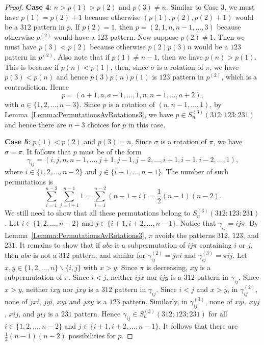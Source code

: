 \documentclass[10pt,a4paper]{amsart}
\newcommand{\half}{{\textstyle\frac12}}
\numberwithin{equation}{section}
\begin{document}
\begin{proof}
    {\bf Case 4}: $n>p(1)>p(2)$ and $p(3)\neq n$. Similar to Case 3, we must have $p(1)=p(2)+1$ because otherwise $(p(1),p(2),p(2)+1)$ would be a $312$ pattern in $p$. If $p(2)=1$, then $p=(2,1,n,n-1,\ldots,3)$ because otherwise $p^{(2)}$ would have a $123$ pattern. Now suppose $p(2)\neq 1$. Then we must have $p(3)<p(2)$ because otherwise $p(2)p(3)n$ would be a $123$ pattern in $p^{(2)}$. Also note that if $p(1)\neq n-1$, then we have $p(n)>p(1)$. This is because if $p(n)<p(1)$, then, since $\sigma$ is a rotation of $\pi$, we have $p(3)<p(n)$ and hence $p(3)p(n)p(1)$ is $123$ pattern in $p^{(2)}$, which is a contradiction. 
Hence
    \[
    p=(a+1,a,a-1,\ldots,1,n,n-1,\ldots,a+2),
    \]
    with $a\in\{1,2,\ldots,n-3\}$. Since $p$ is a rotation of $(n,n-1,\ldots,1)$, by Lemma~\ref{Lemma:PermutationsAvRotations3}, we have $p\in S_n^{(3)}(312:123:231)$ and hence there are $n-3$ choices for $p$ in this case.

    {\bf Case 5}: $p(1)<p(2)$ and $p(3)=n$. Since $\sigma$ is a rotation of $\pi$, we have $\sigma=\pi$. It follows that $p$ must be of the form
    \[
    \gamma_{ij}=(i,j,n,n-1,\ldots,j+1,j-1,j-2,\ldots,i+1,i-1,i-2,\ldots,1),
    \]
    where $i\in\{1,2,\ldots,n-2\}$ and $j\in\{i+1,\ldots,n-1\}$.
    The number of such permutations is
    \[
    \sum_{i=1}^{n-2}\sum_{j=i+1}^{n-1}1=\sum_{i=1}^{n-2}(n-1-i)=\half (n-1)(n-2).
    \]
    We still need to show that all these permutations belong to $S_n^{(3)}(312:123:231)$. Let $i\in\{1,2,\ldots,n-2\}$ and $j\in\{i+1,i+2,\ldots,n-1\}$. Notice that $\gamma_{ij}=ij\pi$. By Lemma~\ref{Lemma:PermutationsAvRotations3}, $\pi$ avoids the patterns $312$, $123$, and $231$. It remains to show that if $abc$ is a subpermutation of $ij\pi$ containing $i$ or $j$, then $abc$ is not a $312$ pattern; and similar for $\gamma_{ij}^{(2)}=j\pi i$ and $\gamma_{ij}^{(3)}=\pi ij$. Let $x,y\in\{1,2,\ldots,n\}\backslash\{i,j\}$ with $x>y$. Since $\pi$ is decreasing, $xy$ is a subpermutation of $\pi$. Since $i<j$, neither $ijx$ nor $ijy$ is a $312$ pattern in $\gamma_{ij}$. Since $x>y$, neither $ixy$ nor $jxy$ is a $312$ pattern in $\gamma_{ij}$. Since $i<j$ and $x>y$, in $\gamma_{ij}^{(2)}$, none of $jxi$, $jyi$, $xyi$ and $jxy$ is a $123$ pattern. Similarly, in $\gamma_{ij}^{(3)}$, none of $xyi$, $xyj$, $xij$, and $yij$ is a $231$ pattern. Hence $\gamma_{ij}\in S_n^{(3)}(312;123;231)$ for all $i\in\{1,2,\ldots,n-2\}$ and $j\in\{i+1,i+2,\ldots,n-1\}$. 
It follows that there are $\half (n-1)(n-2)$ possibilities for $p$.
    

\end{proof}
\end{document}

